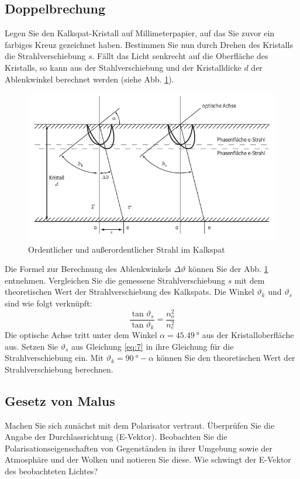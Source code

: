 \subsection{Doppelbrechung}
Legen Sie den Kalkspat-Kristall auf Millimeterpapier, auf das Sie zuvor ein farbiges Kreuz gezeichnet haben. Bestimmen Sie nun durch Drehen des Kristalls die Strahlverschiebung $s$. Fällt das Licht senkrecht auf die Oberfläche des Kristalls, so kann aus der Stahlverschiebung und der Kristalldicke $d$ der Ablenkwinkel berechnet werden (siehe Abb.  \ref{fig:Abb8}).
\begin{figure}[!h]
	\centering
	\includegraphics{doppelbrechung}
	\caption{Ordentlicher und außerordentlicher Strahl im Kalkspat}
	\label{fig:Abb8}
\end{figure} 
Die Formel zur Berechnung des Ablenkwinkels $\Delta\vartheta$ können Sie der Abb. \ref{fig:Abb8} entnehmen. Vergleichen Sie die gemessene Strahlverschiebung $s$ mit dem theoretischen Wert der Strahlverschiebung des Kalkspats. Die Winkel $\vartheta_k$ und $\vartheta_s$ sind wie folgt verknüpft:
\begin{equation}
	\label{eq:7}\frac{\tan\vartheta_s}{\tan\vartheta_k}=\frac{n_o^2}{n_e^2}
\end{equation}
Die optische Achse tritt unter dem Winkel $\alpha=\SI{45.49}{\degree}$ aus der Kristalloberfläche aus. Setzen Sie $\vartheta_s$ aus Gleichung \eqref{eq:7} in ihre Gleichung für die Strahlverschiebung ein. Mit $\vartheta_k=\SI{90}{\degree}-\alpha$ können Sie den theoretischen Wert der Strahlverschiebung berechnen.
\subsection{Gesetz von Malus}\label{GvM}
Machen Sie sich zunächst mit dem Polarisator vertraut. Überprüfen Sie die Angabe der Durchlassrichtung (E-Vektor). Beobachten Sie die Polarisationseigenschaften von Gegenständen in ihrer Umgebung sowie der Atmosphäre und der Wolken und notieren Sie diese. Wie schwingt der E-Vektor des beobachteten Lichtes?

